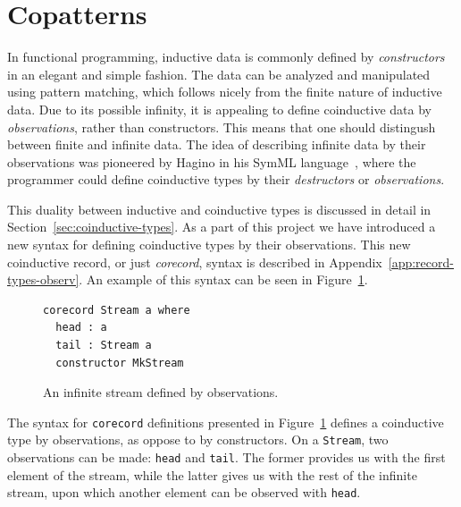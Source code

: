 

\section{Copatterns}
\label{sec:copatterns}
In functional programming, inductive data is commonly defined by \emph{constructors} in an
elegant and simple fashion. The data can be analyzed and manipulated using
pattern matching, which follows nicely from the finite nature of inductive
data. Due to its possible infinity, it is appealing to define coinductive data by
\emph{observations}, rather than constructors. This means that one should distingush
between finite and infinite data. The idea of describing infinite data by their
observations was pioneered by Hagino  in his SymML language \,\citep{Hagino89}, where the programmer could define coinductive types
by their \emph{destructors} or \emph{observations}. 

This duality between inductive and coinductive types is discussed in
detail in Section~\ref{sec:coinductive-types}. As a part of this project we have
introduced a new syntax for defining coinductive types by their
observations. This new coinductive record, or just \emph{corecord}, syntax is described in
Appendix~\ref{app:record-types-observ}. An example of this syntax can be seen in Figure~\ref{fig:stream}.


\begin{figure}[h]
\begin{lstlisting}[mathescape]
corecord Stream a where
  head : a
  tail : Stream a 
  constructor MkStream
\end{lstlisting}
\caption{An infinite stream defined by observations.}
\label{fig:stream}
\end{figure}

The syntax for \texttt{corecord} definitions presented in
Figure~\ref{fig:stream} defines a coinductive type by observations, as oppose to
by constructors. On a \texttt{Stream}, two observations can be made:
\texttt{head} and \texttt{tail}. The former provides us with the first element
of the stream, while the latter gives us with the rest of the infinite stream,
upon which another element can be observed with \texttt{head}. 


